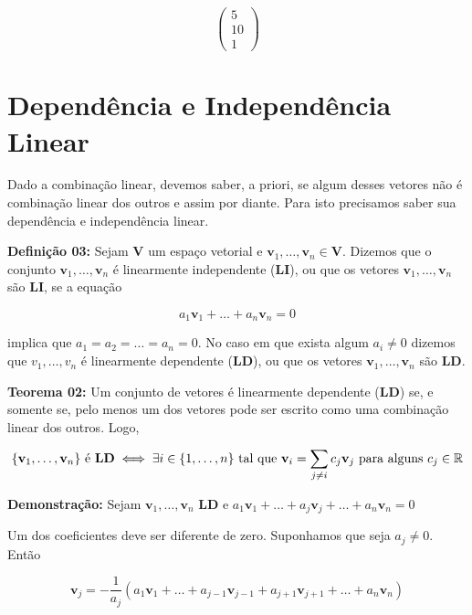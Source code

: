 \[
	\begin{pmatrix} 5 \\ 10 \\ 1 \end{pmatrix}
\]


\section{Dependência e Independência Linear}
Dado a combinação linear, devemos saber, a priori, se algum desses vetores não é combinação linear dos outros e assim por diante. Para isto precisamos saber sua dependência e independência linear.\nocite{camargo2005}

\noindent\textbf{Definição 03:} Sejam $\mathbf{V}$ um espaço vetorial e $\mathbf{v}_1, \ldots, \mathbf{v}_n \in \mathbf{V}$. Dizemos que o conjunto ${\mathbf{v}_1, \ldots, \mathbf{v}_n}$ é linearmente independente (\textbf{LI}), ou que os vetores $\mathbf{v}_1, \ldots, \mathbf{v}_n$ são \textbf{LI}, se a equação

\begin{equation}
	a_1\mathbf{v}_1 + \ldots + a_n\mathbf{v}_n = 0
\end{equation}

\noindent implica que $a_1 = a_2 = \ldots = a_n = 0$. No caso em que exista algum $a_i \neq 0$ dizemos que ${v_1, \ldots, v_n}$ é linearmente dependente (\textbf{LD}), ou que os vetores $\mathbf{v}_1, \ldots, \mathbf{v}_n$ são \textbf{LD}.

\noindent\textbf{Teorema 02:} Um conjunto de vetores é linearmente dependente (\textbf{LD}) se, e somente se, pelo menos um dos vetores pode ser escrito como uma combinação linear dos outros. Logo,

\begin{equation}
	\{\mathbf{v}_1, \ldots, \mathbf{v}_n \} \text{ é \textbf{LD}} \iff \exists i \in \{1, \ldots, n\} \text{ tal que } \mathbf{v}_i = \sum_{j \neq i} c_j \mathbf{v}_j \text{ para alguns } c_j \in \mathbb{R}
\end{equation}

\noindent\textbf{Demonstração:} Sejam $\mathbf{v}_1, \ldots, \mathbf{v}_n$ \textbf{LD} e $a_1\mathbf{v}_1 + \ldots + a_j\mathbf{v}_j + \ldots + a_n\mathbf{v}_n = 0$

\noindent Um dos coeficientes deve ser diferente de zero. Suponhamos que seja $a_j \neq 0$. Então

\begin{equation}
	\mathbf{v}_j = -\frac{1}{a_j}(a_1\mathbf{v}_1 + \ldots + a_{j - 1}\mathbf{v}_{j - 1} + a_{j + 1}\mathbf{v}_{j + 1} + \ldots + a_n\mathbf{v}_n)
\end{equation}

